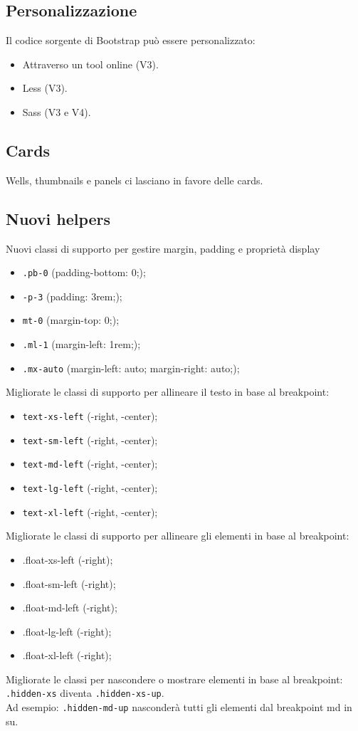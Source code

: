 \documentclass{article}
\begin{document}
\subsection{Personalizzazione}
Il codice sorgente di Bootstrap può essere personalizzato:
\begin{itemize}
    \item Attraverso un tool online (V3).
    \item Less (V3).
    \item Sass (V3 e V4).
\end{itemize}
\subsection{Cards}
Wells, thumbnails e panels ci lasciano in favore delle cards.
\subsection{Nuovi helpers}
Nuovi classi di supporto per gestire margin, padding e proprietà display
\begin{itemize}
    \item \texttt{.pb-0} (padding-bottom: 0;);
    \item \texttt{-p-3} (padding: 3rem;);
    \item \texttt{mt-0} (margin-top: 0;);
    \item \texttt{.ml-1} (margin-left: 1rem;);
    \item \texttt{.mx-auto} (margin-left: auto; margin-right: auto;);
\end{itemize}
Migliorate le classi di supporto per allineare il testo in base al breakpoint:
\begin{itemize}
    \item \texttt{text-xs-left} (-right, -center);
    \item \texttt{text-sm-left} (-right, -center);
    \item \texttt{text-md-left} (-right, -center);
    \item \texttt{text-lg-left} (-right, -center);
    \item \texttt{text-xl-left} (-right, -center);
\end{itemize}
Migliorate le classi di supporto per allineare gli elementi in base al breakpoint:
\begin{itemize}
    \item .float-xs-left (-right);
    \item .float-sm-left (-right);
    \item .float-md-left (-right);
    \item .float-lg-left (-right);
    \item .float-xl-left (-right);
\end{itemize}
Migliorate le classi per nascondere o mostrare elementi in base al breakpoint: \texttt{.hidden-xs} diventa \texttt{.hidden-xs-up}.
\\ Ad esempio: \texttt{.hidden-md-up} nasconderà tutti gli elementi dal breakpoint md in su.
\end{document}
